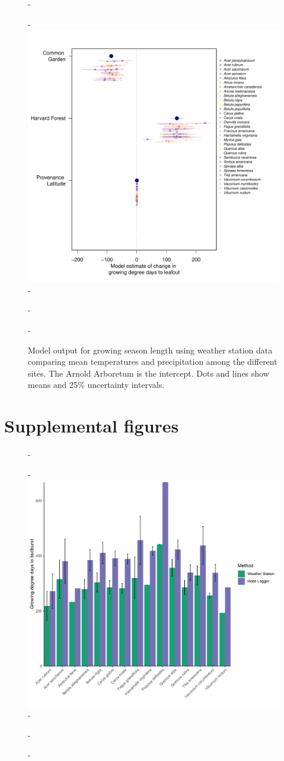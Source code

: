 \documentclass{article}\usepackage[]{graphicx}\usepackage[]{color}
\begin{document}
{{\begin{figure} [H]
  -\begin{center}
  -\includegraphics[width=12cm]{..//analyses/figures/site_prov_all.pdf}
  -\caption{Model output for growing season length using weather station data comparing mean temperatures and precipitation among the different sites. The Arnold Arboretum is the intercept. Dots and lines show means and 25\% uncertainty intervals.}\label{fig:gsclim}
  -\end{center}
  -\end{figure}}

\section*{Supplemental figures}

{\begin{figure} [H]
  -\begin{center}
  -\includegraphics[width=12cm]{..//analyses/figures/stationvshobo_ts2019.pdf}
  -\caption{}\label{fig:barcompare}
  -\end{center}
  -\end{figure}}
  
}
\end{document}
